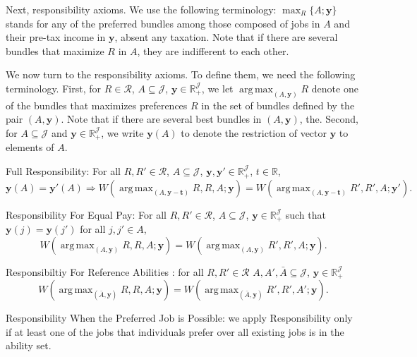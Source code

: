 \documentclass[12pt,thmsb]{article}
\DeclareMathOperator*{\argmax}{arg\,max}
\begin{document}
Next, responsibility axioms. We use the following terminology: $\max_{R}\{A;\mathbf{y}\}$ stands for any of the preferred bundles among those composed of jobs in $A$ and their pre-tax income in $\mathbf{y}$, absent any taxation. Note that if there are several bundles that maximize $R$ in $A$, they are indifferent to each other.

We now turn to the responsibility axioms. To define them, we need the following terminology. First, for $R\in \mathcal{R}$, $A\subseteq \mathcal{J}$, $\mathbf{y} \in \mathbb{R}_{+}^{\mathcal{J}}$, we let $\argmax_{(A,\mathbf{y})}R$ denote one of the bundles that maximizes preferences $R$ in the set of bundles defined by the pair $(A,\mathbf{y})$. Note that if there are several best bundles in $(A,\mathbf{y})$, the. Second, for $A\subseteq \mathcal{J}$ and $\mathbf{y} \in \mathbb{R}_{+}^{\mathcal{J}}$, we write $\mathbf{y}(A)$ to denote the restriction of vector $\mathbf{y}$ to elements of $A$.



Full Responsibility: For all $R,R'\in \mathcal{R}$, $A\subseteq \mathcal{J}$, $\mathbf{y}, \mathbf{y'} \in \mathbb{R}_{+}^{\mathcal{J}}$, $t\in \mathbb{R}$, 
\begin{equation*}
\label{ }
\mathbf{y}(A) = \mathbf{y'}(A)\Rightarrow W(\argmax_{(A,\mathbf{y-t})}R,R,A;\mathbf{y})=W(\argmax_{(A,\mathbf{y -t })}R',R',A;\mathbf{y'}).
\end{equation*}


Responsibility For Equal Pay: For all $R,R'\in \mathcal{R}$, $A\subseteq \mathcal{J}$, $\mathbf{y} \in \mathbb{R}_{+}^{\mathcal{J}}$ such that $\mathbf{y}(j)=\mathbf{y}(j')$ for all $j,j'\in A$, 
\begin{equation*}
\label{ }
W(\argmax_{(A,\mathbf{y})}R,R,A;\mathbf{y})=W(\argmax_{(A,\mathbf{y})}R',R',A;\mathbf{y}).
\end{equation*}


Responsibiltiy For Reference Abilities : for all $R,R' \in \mathcal{R}$ $A,A',\bar A \subseteq \mathcal{J}$, $\mathbf{y} \in \mathbb{R}_{+}^{\mathcal{J}}$
\begin{equation*}
\label{ }
W(\argmax_{(\bar A,\mathbf{y})}R,R,A;\mathbf{y})=W(\argmax_{(\bar A,\mathbf{y})}R',R',A';\mathbf{y}).
\end{equation*}


Responsibility When the Preferred Job is Possible: we apply Responsibility only if at least one of the jobs that individuals prefer over all existing jobs is in the ability set. 
\end{document}
